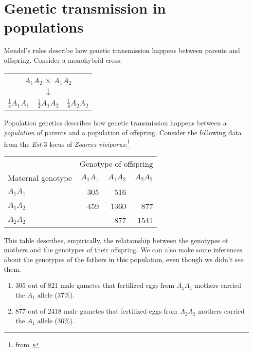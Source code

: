 \chapter{Genetic transmission in populations}

Mendel's rules describe how genetic transmission happens between
parents and offspring. Consider a monohybrid cross:

\begin{center}
\begin{tabular}{ccc}
\multicolumn{3}{c}{$A_1A_2$ $\times$ $A_1A_2$} \\
 & $\downarrow$ & \\
$\frac{1}{4}A_1A_1$ & $\frac{1}{2}A_1A_2$ & $\frac{1}{4}A_2A_2$ \\
\end{tabular}
\end{center}

\noindent Population genetics describes how genetic transmission
happens between a {\it population\/} of parents and a population of
offspring.  Consider the following data from the {\it
  Est\/}-3 locus of {\it Zoarces
  viviparus}:\footnote{from~\cite{Christiansen-1980}}

\begin{center}
\begin{tabular}{lrrr}
                  & \multicolumn{3}{c}{Genotype of offspring} \\
Maternal genotype & $A_1A_1$ & $A_1A_2$ & $A_2A_2$ \\
\hline
$A_1A_1$          &      305 &      516 & \\
$A_1A_2$          &      459 &     1360 & 877 \\
$A_2A_2$          &          &      877 & 1541 \\
\end{tabular}
\end{center}

\noindent This table describes, empirically, the relationship between
the genotypes of mothers and the genotypes of their offspring. We can
also make some inferences about the genotypes of the fathers in this
population, even though we didn't see them.

\begin{enumerate}

\item 305 out of 821 male gametes that fertilized eggs from $A_1A_1$
mothers carried the $A_1$ allele (37\%).

\item 877 out of 2418 male gametes that fertilized eggs from $A_2A_2$
mothers carried the $A_1$ allele (36\%).

\end{enumerate}

